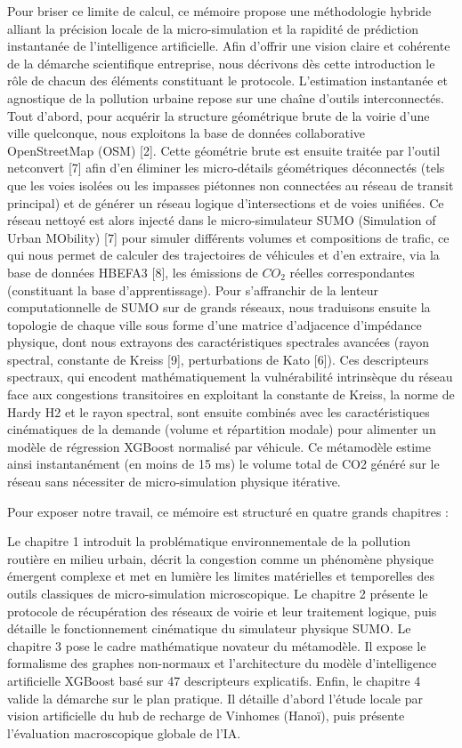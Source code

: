 \documentclass[10pt, a4paper]{article}
\begin{document}
Pour briser ce limite de calcul, ce mémoire propose une méthodologie
hybride alliant la précision locale de la micro-simulation et la
rapidité de prédiction instantanée de l'intelligence artificielle. Afin
d'offrir une vision claire et cohérente de la démarche scientifique
entreprise, nous décrivons dès cette introduction le rôle de chacun des
éléments constituant le protocole. L'estimation instantanée et
agnostique de la pollution urbaine repose sur une chaîne d'outils
interconnectés. Tout d'abord, pour acquérir la structure géométrique
brute de la voirie d'une ville quelconque, nous exploitons la base de
données collaborative OpenStreetMap (OSM) {[}2{]}. Cette géométrie brute
est ensuite traitée par l'outil netconvert {[}7{]} afin d'en éliminer
les micro-détails géométriques déconnectés (tels que les voies isolées
ou les impasses piétonnes non connectées au réseau de transit principal)
et de générer un réseau logique d'intersections et de voies unifiées. Ce
réseau nettoyé est alors injecté dans le micro-simulateur SUMO
(Simulation of Urban MObility) {[}7{]} pour simuler différents volumes
et compositions de trafic, ce qui nous permet de calculer des
trajectoires de véhicules et d'en extraire, via la base de données
HBEFA3 {[}8{]}, les émissions de \(CO_2\) réelles correspondantes
(constituant la base d'apprentissage). Pour s'affranchir de la lenteur
computationnelle de SUMO sur de grands réseaux, nous traduisons ensuite
la topologie de chaque ville sous forme d'une matrice d'adjacence
d'impédance physique, dont nous extrayons des caractéristiques
spectrales avancées (rayon spectral, constante de Kreiss {[}9{]},
perturbations de Kato {[}6{]}). Ces descripteurs spectraux, qui encodent
mathématiquement la vulnérabilité intrinsèque du réseau face aux
congestions transitoires en exploitant la constante de Kreiss, la norme
de Hardy H2 et le rayon spectral, sont ensuite combinés avec les
caractéristiques cinématiques de la demande (volume et répartition
modale) pour alimenter un modèle de régression XGBoost normalisé par
véhicule. Ce métamodèle estime ainsi instantanément (en moins de 15 ms)
le volume total de CO2 généré sur le réseau sans nécessiter de
micro-simulation physique itérative.

Pour exposer notre travail, ce mémoire est structuré en quatre grands
chapitres :

Le chapitre 1 introduit la problématique environnementale de la
pollution routière en milieu urbain, décrit la congestion comme un
phénomène physique émergent complexe et met en lumière les limites
matérielles et temporelles des outils classiques de micro-simulation
microscopique. Le chapitre 2 présente le protocole de récupération des
réseaux de voirie et leur traitement logique, puis détaille le
fonctionnement cinématique du simulateur physique SUMO. Le chapitre 3
pose le cadre mathématique novateur du métamodèle. Il expose le
formalisme des graphes non-normaux et l'architecture du modèle
d'intelligence artificielle XGBoost basé sur 47 descripteurs
explicatifs. Enfin, le chapitre 4 valide la démarche sur le plan
pratique. Il détaille d'abord l'étude locale par vision artificielle du
hub de recharge de Vinhomes (Hanoï), puis présente l'évaluation
macroscopique globale de l'IA.
\end{document}
